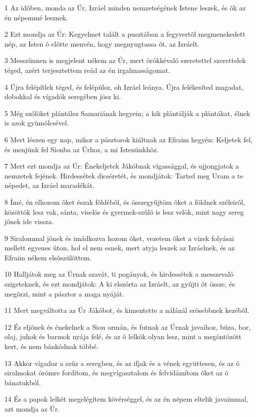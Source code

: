 \par 1 Az idõben, monda az Úr, Izráel minden nemzetségének Istene leszek, és õk az én népemmé lesznek.
\par 2 Ezt mondja az Úr: Kegyelmet talált a pusztában a fegyvertõl megmenekedett nép, az Isten õ elõtte menvén, hogy megnyugtassa õt, az Izráelt.
\par 3 Messzünnen is megjelent nékem az Úr, mert örökkévaló szeretettel szerettelek téged, azért terjesztettem reád az én irgalmasságomat.
\par 4 Újra felépítlek téged, és felépülsz, oh Izráel leánya. Újra felékesíted magadat, dobokkal és vígadók seregében jösz ki.
\par 5 Még szõlõket plántálsz Samariának hegyein; a kik plántálják a plántákat, élnek is azok gyümölcsével.
\par 6 Mert lészen egy nap, mikor a pásztorok kiáltnak az Efraim hegyén: Keljetek fel, és menjünk fel Sionba az Úrhoz, a mi Istenünkhöz.
\par 7 Mert ezt mondja az Úr: Énekeljetek Jákóbnak vígassággal, és ujjongjatok a nemzetek fejének. Hirdessétek dicséretét, és mondjátok: Tartsd meg Uram a te népedet, az Izráel maradékát.
\par 8 Ímé, én elhozom õket észak földébõl, és összegyûjtöm õket a földnek széleirõl, közöttök lesz vak, sánta, viselõs és gyermek-szûlõ is lesz velök, mint nagy sereg jõnek ide vissza.
\par 9 Siralommal jõnek és imádkozva hozom õket, vezetem õket a vizek folyásai mellett egyenes úton, hol el nem esnek, mert atyja leszek az Izráelnek, és az Efraim  nékem elsõszülöttem.
\par 10 Halljátok meg az Úrnak szavát, ti pogányok, és hirdessétek a messzevaló szigeteknek, és ezt mondjátok: A ki elszórta az Izráelt, az gyûjti õt össze, és megõrzi, mint a pásztor a maga nyáját.
\par 11 Mert megváltotta az Úr Jákóbot, és kimentette a nálánál erõsebbnek kezébõl.
\par 12 És eljõnek és énekelnek a Sion ormán, és futnak az Úrnak javaihoz, búza, bor, olaj, juhok és barmok nyája felé, és az õ lelkök olyan lesz, mint a megöntözött kert, és nem bánkódnak többé.
\par 13 Akkor vígadoz a szûz a seregben, és az ifjak és a vének együttesen, és az õ siralmokat örömre fordítom, és megvígasztalom és felvidámítom õket az õ bánatukból.
\par 14 És a papok lelkét megelégítem kövérséggel, és az én népem eltelik javaimmal, azt mondja az Úr.
